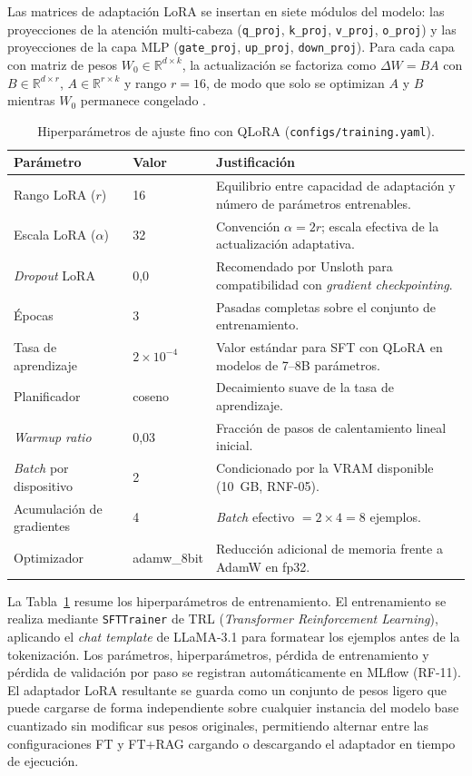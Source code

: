 \documentclass[11pt,a4paper,spanish]{book}
\numberwithin{equation}{chapter}
\numberwithin{figure}{chapter}
\begin{document}
Las matrices de adaptación LoRA se insertan en siete módulos del modelo: las proyecciones de la atención multi-cabeza (\texttt{q\_proj}, \texttt{k\_proj}, \texttt{v\_proj}, \texttt{o\_proj}) y las proyecciones de la capa MLP (\texttt{gate\_proj}, \texttt{up\_proj}, \texttt{down\_proj}). Para cada capa con matriz de pesos $W_0 \in \mathbb{R}^{d \times k}$, la actualización se factoriza como $\Delta W = BA$ con $B \in \mathbb{R}^{d \times r}$, $A \in \mathbb{R}^{r \times k}$ y rango $r = 16$, de modo que solo se optimizan $A$ y $B$ mientras $W_0$ permanece congelado \cite{hu2021loralowrankadaptationlarge}.


\begin{table}[h]
\centering
\begin{tabular}{|l|l|p{}|}
\hline
\textbf{Parámetro} & \textbf{Valor} & \textbf{Justificación} \\
\hline
Rango LoRA ($r$) & 16 & Equilibrio entre capacidad de adaptación y número de parámetros entrenables. \\
\hline
Escala LoRA ($\alpha$) & 32 & Convención $\alpha = 2r$; escala efectiva de la actualización adaptativa. \\
\hline
\textit{Dropout} LoRA & 0{,}0 & Recomendado por Unsloth para compatibilidad con \textit{gradient checkpointing}. \\
\hline
Épocas & 3 & Pasadas completas sobre el conjunto de entrenamiento. \\
\hline
Tasa de aprendizaje & $2 \times 10^{-4}$ & Valor estándar para SFT con QLoRA en modelos de 7--8B parámetros. \\
\hline
Planificador & coseno & Decaimiento suave de la tasa de aprendizaje. \\
\hline
\textit{Warmup ratio} & 0{,}03 & Fracción de pasos de calentamiento lineal inicial. \\
\hline
\textit{Batch} por dispositivo & 2 & Condicionado por la VRAM disponible (10~GB, RNF-05). \\
\hline
Acumulación de gradientes & 4 & \textit{Batch} efectivo $= 2 \times 4 = 8$ ejemplos. \\
\hline
Optimizador & adamw\_8bit & Reducción adicional de memoria frente a AdamW en fp32. \\
\hline
\end{tabular}
\caption{Hiperparámetros de ajuste fino con QLoRA (\texttt{configs/training.yaml}).}
\label{tab:c5_qlora}
\end{table}
La Tabla~\ref{tab:c5_qlora} resume los hiperparámetros de entrenamiento. El entrenamiento se realiza mediante \texttt{SFTTrainer} de TRL (\textit{Transformer Reinforcement Learning}), aplicando el \textit{chat template} de LLaMA-3.1 para formatear los ejemplos antes de la tokenización. Los parámetros, hiperparámetros, pérdida de entrenamiento y pérdida de validación por paso se registran automáticamente en MLflow (RF-11). El adaptador LoRA resultante se guarda como un conjunto de pesos ligero que puede cargarse de forma independiente sobre cualquier instancia del modelo base cuantizado sin modificar sus pesos originales, permitiendo alternar entre las configuraciones FT y FT+RAG cargando o descargando el adaptador en tiempo de ejecución.
\end{document}
